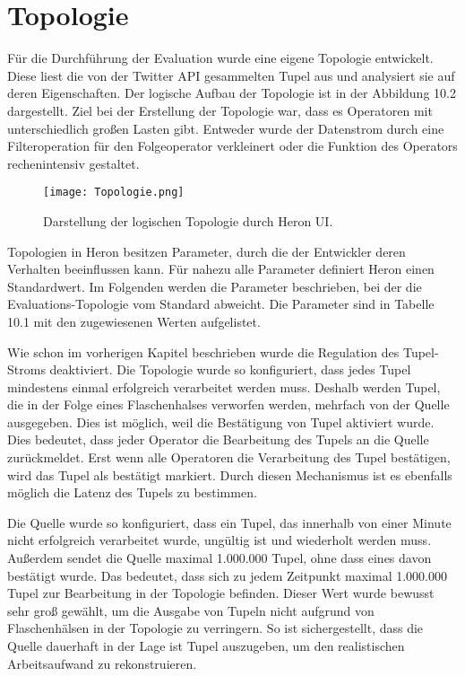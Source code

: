 \section{Topologie}

Für die Durchführung der Evaluation wurde eine eigene Topologie entwickelt.
Diese liest die von der Twitter API gesammelten Tupel aus und analysiert sie auf deren Eigenschaften.
Der logische Aufbau der Topologie ist in der Abbildung 10.2 dargestellt.
Ziel bei der Erstellung der Topologie war, dass es Operatoren mit unterschiedlich großen Lasten gibt.
Entweder wurde der Datenstrom durch eine Filteroperation für den Folgeoperator verkleinert oder die Funktion des Operators rechenintensiv gestaltet.

\begin{figure}
\texttt{[image: Topologie.png]}
\caption{Darstellung der logischen Topologie durch Heron UI.}
\end{figure}

Topologien in Heron besitzen Parameter, durch die der Entwickler deren Verhalten beeinflussen kann.
Für nahezu alle Parameter definiert Heron einen Standardwert.
Im Folgenden werden die Parameter beschrieben, bei der die Evaluations-Topologie vom Standard abweicht.
Die Parameter sind in Tabelle 10.1 mit den zugewiesenen Werten aufgelistet.

Wie schon im vorherigen Kapitel beschrieben wurde die Regulation des Tupel-Stroms deaktiviert.
Die Topologie wurde so konfiguriert, dass jedes Tupel mindestens einmal erfolgreich verarbeitet werden muss.
Deshalb werden Tupel, die in der Folge eines Flaschenhalses verworfen werden, mehrfach von der Quelle ausgegeben.
Dies ist möglich, weil die Bestätigung von Tupel aktiviert wurde.
Dies bedeutet, dass jeder Operator die Bearbeitung des Tupels an die Quelle zurückmeldet.
Erst wenn alle Operatoren die Verarbeitung des Tupel bestätigen, wird das Tupel als bestätigt markiert.
Durch diesen Mechanismus ist es ebenfalls möglich die Latenz des Tupels zu bestimmen.

Die Quelle wurde so konfiguriert, dass ein Tupel, das innerhalb von einer Minute nicht erfolgreich verarbeitet wurde, ungültig ist und wiederholt werden muss.
Außerdem sendet die Quelle maximal 1.000.000 Tupel, ohne dass eines davon bestätigt wurde.
Das bedeutet, dass sich zu jedem Zeitpunkt maximal 1.000.000 Tupel zur Bearbeitung in der Topologie befinden.
Dieser Wert wurde bewusst sehr groß gewählt, um die Ausgabe von Tupeln nicht aufgrund von Flaschenhälsen in der Topologie zu verringern.
So ist sichergestellt, dass die Quelle dauerhaft in der Lage ist Tupel auszugeben, um den realistischen Arbeitsaufwand zu rekonstruieren.

